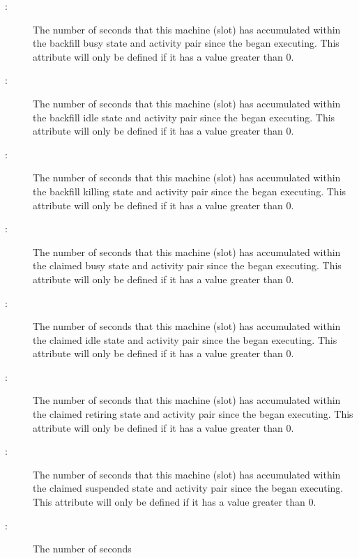 \begin{description}
\item[:] The number of seconds
that this machine (slot) has accumulated within the
backfill busy state and activity pair since the 
began executing.
This attribute will only be defined if it has a value greater than 0.
%
\item[:] The number of seconds
that this machine (slot) has accumulated within the
backfill idle state and activity pair since the 
began executing.
This attribute will only be defined if it has a value greater than 0.
%
\item[:] The number of seconds
that this machine (slot) has accumulated within the
backfill killing state and activity pair since the 
began executing.
This attribute will only be defined if it has a value greater than 0.
%
\item[:] The number of seconds
that this machine (slot) has accumulated within the
claimed busy state and activity pair since the 
began executing.
This attribute will only be defined if it has a value greater than 0.
%
\item[:] The number of seconds
that this machine (slot) has accumulated within the
claimed idle state and activity pair since the 
began executing.
This attribute will only be defined if it has a value greater than 0.
%
\item[:] The number of seconds
that this machine (slot) has accumulated within the
claimed retiring state and activity pair since the 
began executing.
This attribute will only be defined if it has a value greater than 0.
%
\item[:] The number of seconds
that this machine (slot) has accumulated within the
claimed suspended state and activity pair since the 
began executing.
This attribute will only be defined if it has a value greater than 0.
%
\item[:] The number of seconds

\end{description}
